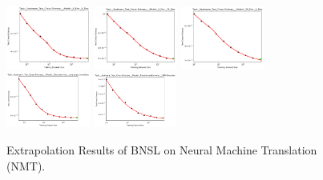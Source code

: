 \documentclass{article} %
\begin{document}
\begin{figure}
    \centering

\includegraphics[width=0.245\textwidth]{figures/scaling_laws_benchmark_dataset_plots/log_perplexity___6_Enc,_6_Dec.png}
\includegraphics[width=0.245\textwidth]{figures/scaling_laws_benchmark_dataset_plots/log_perplexity___6_Enc,_28_Dec.png}
\includegraphics[width=0.245\textwidth]{figures/scaling_laws_benchmark_dataset_plots/log_perplexity___28_Enc,_6_Dec.png}
\includegraphics[width=0.245\textwidth]{figures/scaling_laws_benchmark_dataset_plots/log_perplexity___Decoder-only,_Language_modeling.png}
\includegraphics[width=0.245\textwidth]{figures/scaling_laws_benchmark_dataset_plots/log_perplexity___Transfomer-Encoder,_LSTM-Decoder.png}

    \caption{
    Extrapolation Results of BNSL on Neural Machine Translation (NMT).
    }
    \label{fig:scaling_laws_benchmark_dataset__nmt}
\end{figure}
\end{document}
